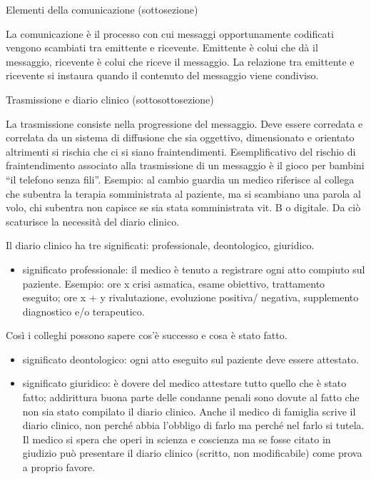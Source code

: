 \documentclass[]{article}
\begin{document}
Elementi della comunicazione (sottosezione)

La comunicazione è il processo con cui messaggi opportunamente
codificati vengono scambiati tra emittente e ricevente. Emittente è
colui che dà il messaggio, ricevente è colui che riceve il messaggio. La
relazione tra emittente e ricevente si instaura quando il contenuto del
messaggio viene condiviso.

Trasmissione e diario clinico (sottosottosezione)

La trasmissione consiste nella progressione del messaggio. Deve essere
corredata e correlata da un sistema di diffusione che sia oggettivo,
dimensionato e orientato altrimenti si rischia che ci si siano
fraintendimenti. Esemplificativo del rischio di fraintendimento
associato alla trasmissione di un messaggio è il gioco per bambini ``il
telefono senza fili''. Esempio: al cambio guardia un medico riferisce al
collega che subentra la terapia somministrata al paziente, ma si
scambiano una parola al volo, chi subentra non capisce se sia stata
somministrata vit. B o digitale. Da ciò scaturisce la necessità del
diario clinico.

Il diario clinico ha tre significati: professionale, deontologico,
giuridico.

\begin{itemize}
\item
  significato professionale: il medico è tenuto a registrare ogni atto
  compiuto sul paziente. Esempio: ore x crisi asmatica, esame obiettivo,
  trattamento eseguito; ore x + y rivalutazione, evoluzione positiva/
  negativa, supplemento diagnostico e/o terapeutico.
\end{itemize}

Così i colleghi possono sapere cos'è successo e cosa è stato fatto.

\begin{itemize}
\item
  significato deontologico: ogni atto eseguito sul paziente deve essere
  attestato.
\item
  significato giuridico: è dovere del medico attestare tutto quello che
  è stato fatto; addirittura buona parte delle condanne penali sono
  dovute al fatto che non sia stato compilato il diario clinico. Anche
  il medico di famiglia scrive il diario clinico, non perché abbia
  l'obbligo di farlo ma perché nel farlo si tutela. Il medico si spera
  che operi in scienza e coscienza ma se fosse citato in giudizio può
  presentare il diario clinico (scritto, non modificabile) come prova a
  proprio favore.
\end{itemize}
\end{document}
